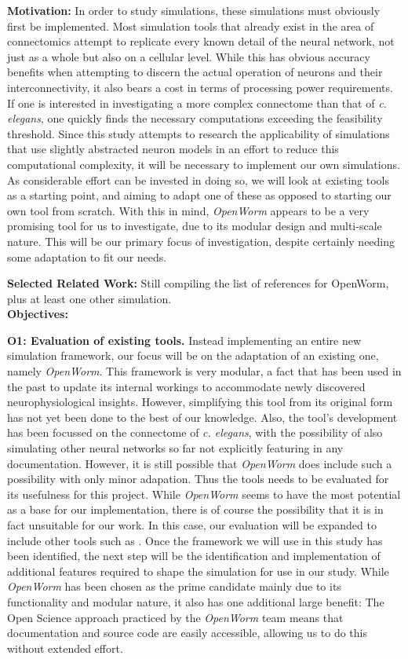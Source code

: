 \documentclass[a4paper,11pt]{article}
\begin{document}
\textbf{Motivation:}
In order to study simulations, these simulations must obviously first be implemented. Most simulation tools that already exist in the area of connectomics attempt to replicate every known detail of the neural network, not just as a whole but also on a cellular level. While this has obvious accuracy benefits when attempting to discern the actual operation of neurons and their interconnectivity, it also bears a cost in terms of processing power requirements. If one is interested in investigating a more complex connectome than that of \emph{c. elegans}, one quickly finds the necessary computations exceeding the feasibility threshold.
Since this study attempts to research the applicability of simulations that use slightly abstracted neuron models in an effort to reduce this computational complexity, it will be necessary to implement our own simulations. As considerable effort can be invested in doing so, we will look at existing tools as a starting point, and aiming to adapt one of these as opposed to starting our own tool from scratch. With this in mind, \emph{OpenWorm} appears to be a very promising tool for us to investigate, due to its modular design and multi-scale nature. This will be our primary focus of investigation, despite certainly needing some adaptation to fit our needs.

\textbf{Selected Related Work:}
Still compiling the list of references for OpenWorm, plus at least one other simulation.
\\[0,2cm]

\textbf{Objectives:}

\textbf{O1: Evaluation of existing tools.} 
Instead implementing an entire new simulation framework, our focus will be on the adaptation of an existing one, namely \emph{OpenWorm}. This framework is very modular, a fact that has been used in the past to update its internal workings to accommodate newly discovered neurophysiological insights. However, simplifying this tool from its original form has not yet been done to the best of our knowledge. Also, the tool's development has been focussed on the connectome of \emph{c. elegans}, with the possibility of also simulating other neural networks so far not explicitly featuring in any documentation. However, it is still possible that \emph{OpenWorm} does include such a possibility with only minor adapation. Thus the tools needs to be evaluated for its usefulness for this project.
While \emph{OpenWorm} seems to have the most potential as a base for our implementation, there is of course the possibility that it is in fact unsuitable for our work. In this case, our evaluation will be expanded to include other tools such as .
Once the framework we will use in this study has been identified, the next step will be the identification and implementation of additional features required to shape the simulation for use in our study.
While \emph{OpenWorm} has been chosen as the prime candidate mainly due to its functionality and modular nature, it also has one additional large benefit: The Open Science approach practiced by the \emph{OpenWorm} team means that documentation and source code are easily accessible, allowing us to do this without extended effort.
\end{document}
